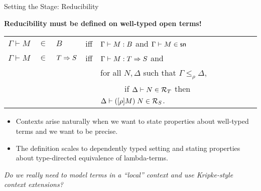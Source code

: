 \begin{frame}{Setting the Stage: Reducibility}

  \begin{center}
\textbf{Reducibility must be defined on well-typed open terms!}
  \end{center}
\vspace{1ex}
\pause
\begin{definition}
\mbox{}
\begin{tabular}{l@{~}c@{~}lll}
  $\Gamma \vdash M$ & $\in$ & $B$ & iff & $\Gamma\vdash M\mathrel{:} B$
                                          and $\Gamma \vdash M \in \mathsf{sn}$\\
  $\Gamma \vdash M$ & $\in$ & ${T\Rightarrow S}$ & iff &
$ \Gamma\vdash M\mathrel{:} {T\Rightarrow S}$ and  \\
  & & & & for all $N,\Delta$ such that
  $\Gamma \leq_\rho \Delta$,  \\
  & & & & ~~~~~~if $\Delta \vdash N\in \mathcal{R}_{T} $ then
  $\Delta \vdash ([\rho]M) \; N\in \mathcal{R}_{S} $.

\end{tabular}
\end{definition}
\vspace{1ex}
\begin{itemize}
\item Contexts arise naturally when we want to state properties about
  well-typed terms and we want to be precise.
\item The definition scales to dependently typed setting and stating
  properties about type-directed equivalence of lambda-terms.
\end{itemize}
\pause
\vspace{1ex}
{\centering \textit {Do we really need to model terms in a ``local'' context and
  use Kripke-style context extensions?}}
\pause


\end{frame}




